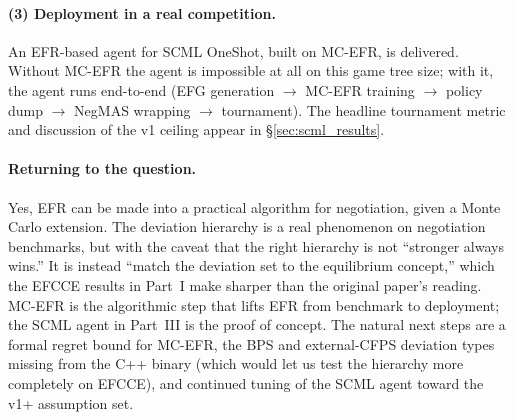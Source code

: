 \documentclass[11pt]{article}
\begin{document}
\paragraph{(3) Deployment in a real competition.} An EFR-based agent for SCML OneShot, built on MC-EFR, is delivered. Without MC-EFR the agent is impossible at all on this game tree size; with it, the agent runs end-to-end (EFG generation $\to$ MC-EFR training $\to$ policy dump $\to$ NegMAS wrapping $\to$ tournament). The headline tournament metric and discussion of the v1 ceiling appear in \S\ref{sec:scml_results}.

\paragraph{Returning to the question.} Yes, EFR can be made into a practical algorithm for negotiation, given a Monte Carlo extension. The deviation hierarchy is a real phenomenon on negotiation benchmarks, but with the caveat that the right hierarchy is not ``stronger always wins.'' It is instead ``match the deviation set to the equilibrium concept,'' which the EFCCE results in Part~I make sharper than the original paper's reading. MC-EFR is the algorithmic step that lifts EFR from benchmark to deployment; the SCML agent in Part~III is the proof of concept. The natural next steps are a formal regret bound for MC-EFR, the BPS and external-CFPS deviation types missing from the C++ binary (which would let us test the hierarchy more completely on EFCCE), and continued tuning of the SCML agent toward the v1+ assumption set.
\end{document}
